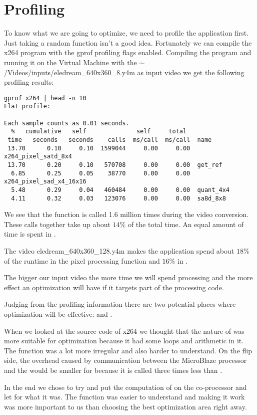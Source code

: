 \section{Profiling}

To know what we are going to optimize, we need to profile the application
first. Just taking a random function isn't a good idea. Fortunately we can
compile the x264 program with the gprof profiling flags enabled. Compiling the
program and running it on the Virtual Machine with the
$\sim$/Videos/inputs/eledream\_640x360\_8.y4m as input video we get the
following profiling results:

\begin{small}
\begin{lstlisting}
gprof x264 | head -n 10
Flat profile:

Each sample counts as 0.01 seconds.
  %   cumulative   self              self     total
 time   seconds   seconds    calls  ms/call  ms/call  name
 13.70      0.10     0.10  1599044     0.00     0.00  x264_pixel_satd_8x4
 13.70      0.20     0.10   570708     0.00     0.00  get_ref
  6.85      0.25     0.05    38770     0.00     0.00  x264_pixel_sad_x4_16x16
  5.48      0.29     0.04   460484     0.00     0.00  quant_4x4
  4.11      0.32     0.03   123076     0.00     0.00  sa8d_8x8
\end{lstlisting}\end{small}

We see that the function \satd{} is called 1.6 million times during the video
conversion. These calls together take up about $14\%$ of the total time. An
equal amount of time is spent in \satd{}.

The video eledream\_640x360\_128.y4m makes the application spend about $18\%$
of the runtime in the pixel processing function and $16\%$ in \getref{}.

The bigger our input video the more time we will spend processing and the more
effect an optimization will have if it targets part of the processing code.

Judging from the profiling information there are two potential places where
optimization will be effective: \satd{} and \getref{}.

When we looked at the source code of x264 we thought that the nature of \satd{}
was more suitable for optimization because it had some loops and arithmetic in
it. The \getref{} function was a lot more irregular and also harder to
understand. On the flip side, the overhead caused by communication between the
MicroBlaze processor and the \rvex{} would be smaller for \getref{} because it
is called three times less than \satd{}.

In the end we chose to try and put the computation of \satd{} on the
co-processor and let \getref{} for what it was.  The function \satd{} was
easier to understand and making it work was more important to us than choosing
the best optimization area right away.

